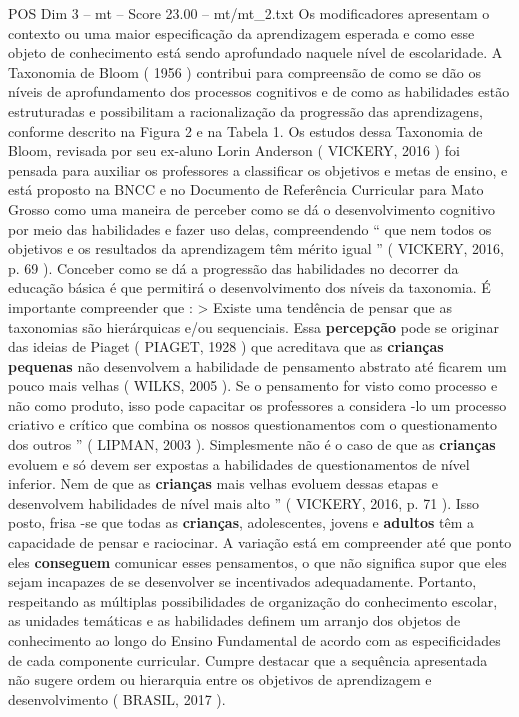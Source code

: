 \begin{textsample}{POS Dim 3 – mt – Score 23.00 – mt/mt\_2.txt}
Os modificadores apresentam o contexto ou uma maior especificação da aprendizagem esperada e como esse objeto de conhecimento está sendo aprofundado naquele nível de escolaridade.
A Taxonomia de Bloom ( 1956 ) contribui para compreensão de como se dão os níveis de aprofundamento dos processos cognitivos e de como as habilidades estão estruturadas e possibilitam a racionalização da progressão das aprendizagens, conforme descrito na Figura 2 e na Tabela 1.
Os estudos dessa Taxonomia de Bloom, revisada por seu ex-aluno Lorin Anderson ( VICKERY, 2016 ) foi pensada para auxiliar os professores a classificar os objetivos e metas de ensino, e está proposto na BNCC e no Documento de Referência Curricular para Mato Grosso como uma maneira de perceber como se dá o desenvolvimento cognitivo por meio das habilidades e fazer uso delas, compreendendo “ que nem todos os objetivos e os resultados da aprendizagem têm mérito igual ” ( VICKERY, 2016, p. 69 ).
Conceber como se dá a progressão das habilidades no decorrer da educação básica é que permitirá o desenvolvimento dos níveis da taxonomia.
É importante compreender que : > Existe uma tendência de pensar que as taxonomias são hierárquicas e/ou sequenciais.
Essa \textbf{percepção} pode se originar das ideias de Piaget ( PIAGET, 1928 ) que acreditava que as \textbf{crianças} \textbf{pequenas} não desenvolvem a habilidade de pensamento abstrato até ficarem um pouco mais velhas ( WILKS, 2005 ).
Se o pensamento for visto como processo e não como produto, isso pode capacitar os professores a considera -lo um processo criativo e crítico que combina os nossos questionamentos com o questionamento dos outros ” ( LIPMAN, 2003 ).
Simplesmente não é o caso de que as \textbf{crianças} evoluem e só devem ser expostas a habilidades de questionamentos de nível inferior.
Nem de que as \textbf{crianças} mais velhas evoluem dessas etapas e desenvolvem habilidades de nível mais alto ” ( VICKERY, 2016, p. 71 ).
Isso posto, frisa -se que todas as \textbf{crianças}, adolescentes, jovens e \textbf{adultos} têm a capacidade de pensar e raciocinar.
A variação está em compreender até que ponto eles \textbf{conseguem} comunicar esses pensamentos, o que não significa supor que eles sejam incapazes de se desenvolver se incentivados adequadamente.
Portanto, respeitando as múltiplas possibilidades de organização do conhecimento escolar, as unidades temáticas e as habilidades definem um arranjo dos objetos de conhecimento ao longo do Ensino Fundamental de acordo com as especificidades de cada componente curricular.
Cumpre destacar que a sequência apresentada não sugere ordem ou hierarquia entre os objetivos de aprendizagem e desenvolvimento ( BRASIL, 2017 ).

\end{textsample}
